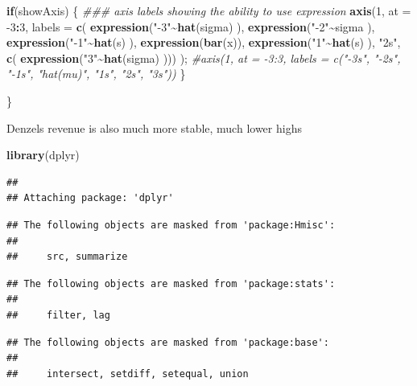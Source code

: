 \documentclass[]{article}
\newenvironment{Shaded}{\begin{snugshade}}{\end{snugshade}}
\newcommand{\CommentTok}[1]{\textcolor[rgb]{0.56,0.35,0.01}{\textit{#1}}}
\newcommand{\ControlFlowTok}[1]{\textcolor[rgb]{0.13,0.29,0.53}{\textbf{#1}}}
\newcommand{\DataTypeTok}[1]{\textcolor[rgb]{0.13,0.29,0.53}{#1}}
\newcommand{\DecValTok}[1]{\textcolor[rgb]{0.00,0.00,0.81}{#1}}
\newcommand{\KeywordTok}[1]{\textcolor[rgb]{0.13,0.29,0.53}{\textbf{#1}}}
\newcommand{\NormalTok}[1]{#1}
\newcommand{\OperatorTok}[1]{\textcolor[rgb]{0.81,0.36,0.00}{\textbf{#1}}}
\newcommand{\StringTok}[1]{\textcolor[rgb]{0.31,0.60,0.02}{#1}}
\begin{document}
\begin{Shaded}
\begin{Highlighting}[]
    
  \ControlFlowTok{if}\NormalTok{(showAxis)}
\NormalTok{    \{}
  \CommentTok{\#\#\# axis labels showing the ability to use expression         }
    \KeywordTok{axis}\NormalTok{(}\DecValTok{1}\NormalTok{, }\DataTypeTok{at =} \DecValTok{{-}3}\OperatorTok{:}\DecValTok{3}\NormalTok{, }\DataTypeTok{labels =} \KeywordTok{c}\NormalTok{( }\KeywordTok{expression}\NormalTok{(}\StringTok{"{-}3"}\OperatorTok{\textasciitilde{}}\KeywordTok{hat}\NormalTok{(sigma) ), }\KeywordTok{expression}\NormalTok{(}\StringTok{"{-}2"}\OperatorTok{\textasciitilde{}}\NormalTok{sigma ), }\KeywordTok{expression}\NormalTok{(}\StringTok{"{-}1"}\OperatorTok{\textasciitilde{}}\KeywordTok{hat}\NormalTok{(s) ), }\KeywordTok{expression}\NormalTok{(}\KeywordTok{bar}\NormalTok{(x)), }\KeywordTok{expression}\NormalTok{(}\StringTok{"1"}\OperatorTok{\textasciitilde{}}\KeywordTok{hat}\NormalTok{(s) ), }\StringTok{"2s"}\NormalTok{, }\KeywordTok{c}\NormalTok{( }\KeywordTok{expression}\NormalTok{(}\StringTok{"3"}\OperatorTok{\textasciitilde{}}\KeywordTok{hat}\NormalTok{(sigma) ))) );}
        \CommentTok{\#axis(1, at = {-}3:3, labels = c("{-}3s", "{-}2s", "{-}1s", "hat(mu)", "1s", "2s", "3s"))       }
\NormalTok{    \}}
            
  
\NormalTok{  \}}
\end{Highlighting}
\end{Shaded}

Denzels revenue is also much more stable, much lower highs

\begin{Shaded}
\begin{Highlighting}[]
\KeywordTok{library}\NormalTok{(dplyr)}
\end{Highlighting}
\end{Shaded}

\begin{verbatim}
## 
## Attaching package: 'dplyr'
\end{verbatim}

\begin{verbatim}
## The following objects are masked from 'package:Hmisc':
## 
##     src, summarize
\end{verbatim}

\begin{verbatim}
## The following objects are masked from 'package:stats':
## 
##     filter, lag
\end{verbatim}

\begin{verbatim}
## The following objects are masked from 'package:base':
## 
##     intersect, setdiff, setequal, union
\end{verbatim}
\end{document}
